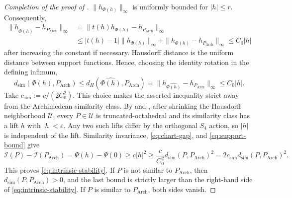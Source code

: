 \documentclass[10pt,a4paper]{amsart}
\newcommand{\Arch}{P_{\mathrm{Arch}}}
\newcommand{\Ical}{\mathcal I}
\begin{document}
\begin{proof}[Completion of the proof of ]
$\|h_{\Phi(h)}\|_\infty$ is uniformly bounded for $|h|\leq r$.
Consequently,
\[
\begin{aligned}
 \|h_{\widehat{\Phi(h)}}-h_{\Arch}\|_\infty
 &=
 \|t(h)h_{\Phi(h)}-h_{\Arch}\|_\infty                         \\
 &\leq
 |t(h)-1|\|h_{\Phi(h)}\|_\infty
 +\|h_{\Phi(h)}-h_{\Arch}\|_\infty              \leq C_0|h|
\end{aligned}
\]
after increasing the constant if necessary.  Hausdorff distance is the
uniform distance between support functions.  Hence, choosing the identity
rotation in the defining infimum,
\begin{equation}\label{eq:support-bound}
 d_{\mathrm{sim}}(\Phi(h),\Arch)
 \leq d_H(\widehat{\Phi(h)},\Arch)
 =\|h_{\widehat{\Phi(h)}}-h_{\Arch}\|_\infty
 \leq C_0|h|.
\end{equation}  
Take $c_{\mathrm{sim}}:=c/(2C_0^2)$. 
This choice makes the asserted inequality strict away from the Archimedean similarity class.  
By  and , after shrinking the Hausdorff neighborhood
$\mathcal U$, every $P\in\mathcal U$ is truncated-octahedral and its similarity class has
a lift $h$ with $|h|<\varepsilon$.  Any two such lifts differ by the orthogonal $S_4$
action, so $|h|$ is independent of the lift.  Similarity
invariance, \eqref{eq:chart-gap}, and \eqref{eq:support-bound} give
\[
 \Ical(P)-\Ical(\Arch)=\Psi(h)-\Psi(0)
 \geq c|h|^2
 \geq \frac{c}{C_0^2}d_{\mathrm{sim}}(P,\Arch)^2
 =2c_{\mathrm{sim}}d_{\mathrm{sim}}(P,\Arch)^2.
\]
This proves \eqref{eq:intrinsic-stability}.  If $P$ is not similar to $\Arch$, then
$d_{\mathrm{sim}}(P,\Arch)>0$, and the last bound is strictly larger than the right-hand
side of \eqref{eq:intrinsic-stability}.  If $P$ is similar to $\Arch$, both sides vanish.
\end{proof}
\end{document}
